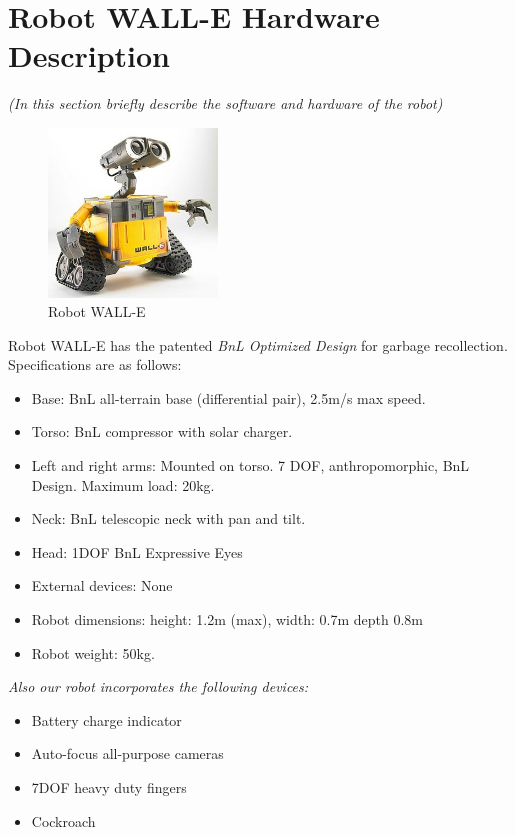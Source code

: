 \section*{Robot WALL-E Hardware Description}
\textit{(In this section briefly describe the software and hardware of the robot)}


\setlength\intextsep{0pt}
\begin{figure}
	\centering
	\includegraphics[width=0.4\textwidth]{images/wall-e.jpg}
	\caption{Robot WALL-E}
	\label{fig:wall-e}
\end{figure}

Robot WALL-E has the patented \textit{BnL Optimized Design} for garbage recollection. Specifications are as follows:

\begin{itemize}
	\item Base: BnL all-terrain base (differential pair), 2.5m/s max speed.
	\item Torso: BnL compressor with solar charger.
	\item Left and right arms: Mounted on torso. 7 DOF, anthropomorphic, BnL Design. Maximum load: 20kg.
	\item Neck: BnL telescopic neck with pan and tilt.
	\item Head: 1DOF BnL Expressive Eyes
	\item External devices: None
	\item Robot dimensions: height: 1.2m (max), width: 0.7m depth 0.8m
	\item Robot weight: 50kg.
\end{itemize}

\textit{Also our robot incorporates the following devices:}

\begin{itemize}
	\item \BnL Battery charge indicator
	\item \BnL Auto-focus all-purpose cameras
	\item \BnL 7DOF heavy duty fingers
	\item \BnL Cockroach
\end{itemize}


